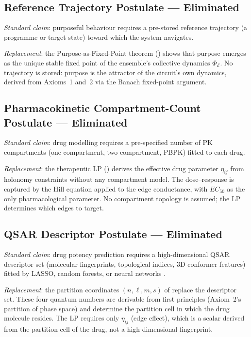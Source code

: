 \subsection{Reference Trajectory Postulate — Eliminated}

\emph{Standard claim}: purposeful behaviour requires a pre-stored reference
trajectory (a programme or target state) toward which the system navigates.

\emph{Replacement}: the Purpose-as-Fixed-Point theorem ()
shows that purpose emerges as the unique stable fixed point of the ensemble's
collective dynamics $\Phi_\mathcal{E}$.  No trajectory is stored: purpose is
the attractor of the circuit's own dynamics, derived from Axioms~1 and~2 via
the Banach fixed-point argument.

\subsection{Pharmacokinetic Compartment-Count Postulate — Eliminated}

\emph{Standard claim}: drug modelling requires a pre-specified number of PK
compartments (one-compartment, two-compartment, PBPK) fitted to each drug.

\emph{Replacement}: the therapeutic LP () derives
the effective drug parameter $\eta_{ij}$ from holonomy constraints without any
compartment model.  The dose--response is captured by the Hill equation applied
to the edge conductance, with $EC_{50}$ as the only pharmacological parameter.
No compartment topology is assumed; the LP determines which edges to target.

\subsection{QSAR Descriptor Postulate — Eliminated}

\emph{Standard claim}: drug potency prediction requires a high-dimensional
QSAR descriptor set (molecular fingerprints, topological indices, 3D conformer
features) fitted by LASSO, random forests, or neural networks
\citep{Tibshirani1996}.

\emph{Replacement}: the partition coordinates $(n, \ell, m, s)$ of 
replace the descriptor set.  These four quantum numbers are derivable from
first principles (Axiom~2's partition of phase space) and determine the
partition cell in which the drug molecule resides.  The LP requires only
$\eta_{ij}$ (edge effect), which is a scalar derived from the partition cell
of the drug, not a high-dimensional fingerprint.

